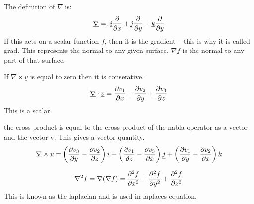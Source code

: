 \documentclass[10pt,\jkfside,a4paper]{article}
\begin{document}
The definition of $\nabla$ is:
\begin{equation}
\underline{\nabla} =: \underline{i}\pdv{x} + \underline{j}\pdv{y} + \underline{k}\pdv{y} \\
\end{equation}
If this acts on a scalar function $f$, then it is the gradient -- this is why it is called grad.
This represents the normal to any given surface. $\nabla f$ is the normal to any part of that surface.


If $\underline{\nabla}\times \underline{v}$ is equal to zero then it is conserative.
\begin{equation}
\underline{\nabla}\cdot \underline{v} = \pdv{v_1}{x} + \pdv{v_2}{y} + \pdv{v_3}{z} \\
\end{equation}
This is a scalar.

the cross product is equal to the cross product of the nabla operator as a vector and the vector v. 
This gives a vector quantity. 
\begin{equation}
\underline{\nabla}\times\underline{v} = \left(\pdv{v_3}{y} - \pdv{v_2}{z}\right)\underline{i} + \left(\pdv{v_1}{z} - \pdv{v_3}{x}\right)\underline{j} + \left(\pdv{v_1}{y} - \pdv{v_2}{x}\right)\underline{k} \\
\end{equation}

\begin{equation}
\nabla^2 f = \nabla(\nabla f) = \pdv[2]{f}{x} + \pdv[2]{f}{y} + \pdv[2]{f}{z} \\
\end{equation}
This is known as the laplacian and is used in laplaces equation.
\end{document}
